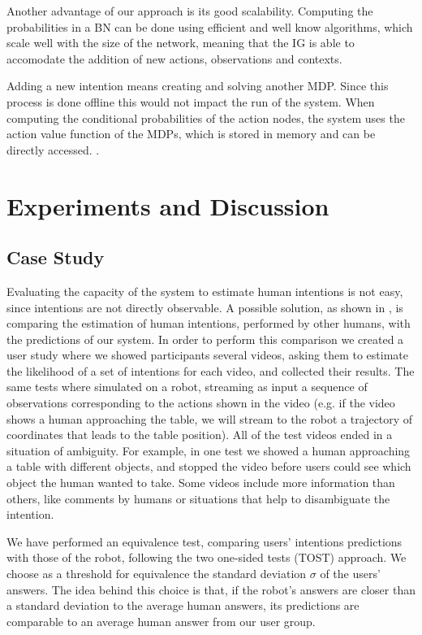 Another advantage of our approach is its good scalability. Computing the probabilities in a BN can be done using efficient and well know algorithms, which scale well with the size of the network, meaning that the IG is able to accomodate the addition of new actions, observations and contexts. 

Adding a new intention means creating and solving another MDP. Since this process is done offline this would not impact the run of the system. When computing the conditional probabilities of the action nodes, the system uses the action value function of the MDPs, which is stored in memory and can be directly accessed.
.
\section{Experiments and Discussion}
\label{sec:situation_assessment-experiments}
\subsection{Case Study}
Evaluating the capacity of the system to estimate human intentions is not easy, since intentions are not directly observable. A possible solution, as shown in \cite{baker2014modeling}, is comparing the estimation of human intentions, performed by other humans, with the predictions of our system. In order to perform this comparison we created a user study where we showed participants several videos, asking them to estimate the likelihood of a set of intentions  for each video, and collected their results. The same tests where simulated on a robot, streaming as input a sequence of observations  corresponding to the actions shown in the video (e.g. if the video shows a human approaching the table, we will stream to the robot a trajectory of coordinates that leads to the table position). All of the test videos ended in a situation of ambiguity. For example, in one test we showed a human approaching a table with different objects, and stopped the video before users could see which object the human wanted to take. Some videos include more information than others, like comments by humans or situations that help to disambiguate the intention. 

We have performed an equivalence test, comparing users' intentions predictions with those of the robot, following the two one-sided tests (TOST) approach. We choose as a threshold for equivalence the standard deviation $\sigma$ of the users' answers. The idea behind this choice is that, if the robot's answers are closer than a standard deviation to the average human answers, its predictions are comparable to an average human answer from our user group. 

